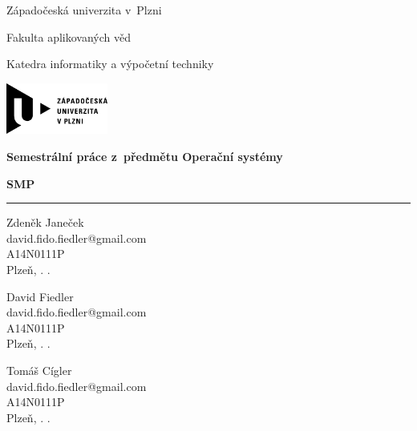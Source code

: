\documentclass[a4paper,12pt]{article}
\begin{document}
\begin{titlepage}

\sffamily	%

	\begin{center}
		\begin{Large}
		
		Západočeská univerzita v~Plzni

		\vspace*{0.2cm}
		
		Fakulta aplikovaných věd

		\vspace*{0.2cm}
		
		Katedra informatiky a výpočetní techniky
		
		\vspace*{5mm}

		\includegraphics[width=0.25\textwidth]{obrazky/logo_zcu}	
		
		\vspace*{2cm}
		
		{\Huge\bfseries Semestrální práce z~předmětu Operační systémy}

		\vspace*{1cm}
		
		{\bfseries SMP}
		\end{Large}
	\end{center}
	
	\vfill

	\hrule
	
	\vspace*{0.2cm}	
	
	\noindent
	Zdeněk Janeček \\ 
	david.fido.fiedler@gmail.com \\
	A14N0111P \\
	Plzeň, \number\day. \number\month. \number\year

	\vspace*{0.2cm}	
	
	\noindent
	David Fiedler \\ 
	david.fido.fiedler@gmail.com \\
	A14N0111P \\
	Plzeň, \number\day. \number\month. \number\year
	
	\vspace*{0.2cm}	
	
	\noindent
	Tomáš Cígler \\ 
	david.fido.fiedler@gmail.com \\
	A14N0111P \\
	Plzeň, \number\day. \number\month. \number\year

\rmfamily	%

\end{titlepage}
\end{document}
